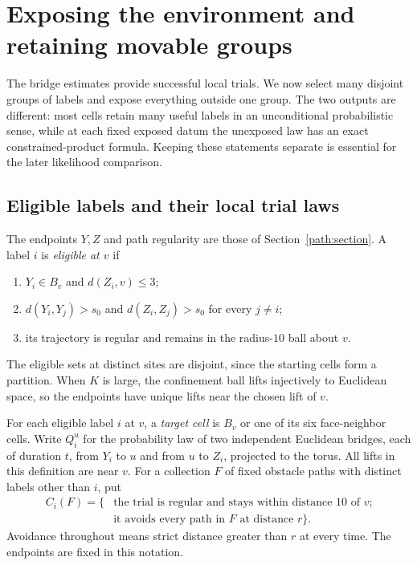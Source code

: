 \section{Exposing the environment and retaining movable groups}
\label{group:section}

The bridge estimates provide successful local trials.  We now select
many disjoint groups of labels and expose everything outside one group.
The two outputs are different: most cells retain many useful labels in
an unconditional probabilistic sense, while at each fixed exposed datum
the unexposed law has an exact constrained-product formula.  Keeping
these statements separate is essential for the later likelihood comparison.

\subsection{Eligible labels and their local trial laws}

The endpoints $Y,Z$ and path regularity are those of
Section~\ref{path:section}.  A label $i$ is \emph{eligible at $v$} if
\begin{enumerate}[label=\textup{(\roman*)}]
 \item $Y_i\in B_v$ and $d(Z_i,v)\le3$;
 \item $d(Y_i,Y_j)>s_0$ and $d(Z_i,Z_j)>s_0$ for every $j\ne i$;
 \item its trajectory is regular and remains in the radius-$10$ ball
 about $v$.
\end{enumerate}
The eligible sets at distinct sites are disjoint, since the starting
cells form a partition.  When $K$ is large, the confinement ball lifts
injectively to Euclidean space, so the endpoints have unique lifts
near the chosen lift of $v$.

For each eligible label $i$ at $v$, a \emph{target cell} is $B_v$ or
one of its six face-neighbor cells.  Write $Q_i^u$ for the probability
law of two independent Euclidean bridges, each of duration $t$, from
$Y_i$ to $u$ and from $u$ to $Z_i$, projected to the torus.  All lifts
in this definition are near $v$.  For a collection $F$ of fixed
obstacle paths with distinct labels other than $i$, put
\begin{equation}\label{group:success-event}
 \begin{split}
 C_i(F)=\{&\text{the trial is regular and stays within distance $10$ of $v$;}\\
          &\text{it avoids every path in $F$ at distance $r$}\}.
 \end{split}
\end{equation}
Avoidance throughout means strict distance greater than $r$ at every
time.  The endpoints are fixed in this notation.

